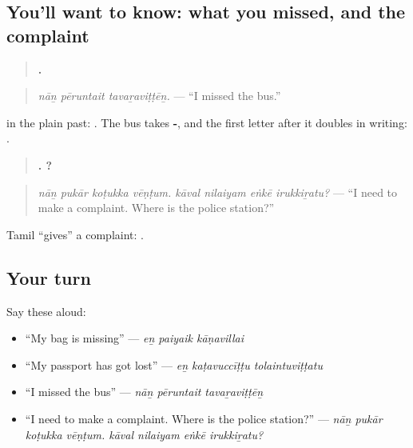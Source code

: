 \subsection*{You'll want to know: what you missed, and the complaint}
\begin{quote}
\textbf{  .}
\end{quote}

\begin{quote}
\emph{nāṉ pēruntait tavaṟaviṭṭēṉ.} — \textquotedblleft{}I missed the bus.\textquotedblright{}
\end{quote}

\textbf{} in the plain past: \textbf{}. The bus takes \textbf{-}, and the first letter after it doubles in writing: \textbf{ }.

\begin{quote}
\textbf{   .    ?}
\end{quote}

\begin{quote}
\emph{nāṉ pukār koṭukka vēṇṭum. kāval nilaiyam eṅkē irukkiṟatu?} — \textquotedblleft{}I need to make a complaint. Where is the police station?\textquotedblright{}
\end{quote}

Tamil \textquotedblleft{}gives\textquotedblright{} a complaint: \textbf{ }.

\subsection*{Your turn}
Say these aloud:

\begin{itemize}
\raggedright
  \item \textquotedblleft{}My bag is missing\textquotedblright{} — \emph{eṉ paiyaik kāṇavillai}
  \item \textquotedblleft{}My passport has got lost\textquotedblright{} — \emph{eṉ kaṭavuccīṭṭu tolaintuviṭṭatu}
  \item \textquotedblleft{}I missed the bus\textquotedblright{} — \emph{nāṉ pēruntait tavaṟaviṭṭēṉ}
  \item \textquotedblleft{}I need to make a complaint. Where is the police station?\textquotedblright{} — \emph{nāṉ pukār koṭukka vēṇṭum. kāval nilaiyam eṅkē irukkiṟatu?}
\end{itemize}

